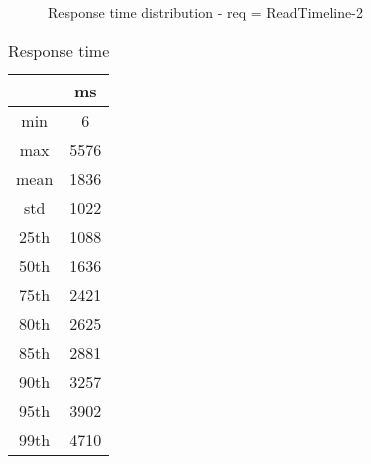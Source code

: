 \begin{minipage}{0.75\linewidth}
\begin{figure}[h]
\begin{adjustbox}{max width=1.0\linewidth, keepaspectratio}
  \end{adjustbox}
  \caption{Response time distribution - req = ReadTimeline-2}
\end{figure}
\end{minipage}\hfill\begin{minipage}{0.18\linewidth}
\begin{table}[h]
\begin{tabular}{|cc|}
\hline
\textbf{} & \textbf{ms}\\ \hline
 \Xhline{0.005\arrayrulewidth}
min & 6\\
 \Xhline{0.005\arrayrulewidth}
max & 5576\\
 \Xhline{0.005\arrayrulewidth}
mean & 1836\\
 \Xhline{0.005\arrayrulewidth}
std & 1022\\
\hline
\hline
 \Xhline{0.005\arrayrulewidth}
25th & 1088\\
 \Xhline{0.005\arrayrulewidth}
50th & 1636\\
 \Xhline{0.005\arrayrulewidth}
75th & 2421\\
 \Xhline{0.005\arrayrulewidth}
80th & 2625\\
 \Xhline{0.005\arrayrulewidth}
85th & 2881\\
 \Xhline{0.005\arrayrulewidth}
90th & 3257\\
 \Xhline{0.005\arrayrulewidth}
95th & 3902\\
 \Xhline{0.005\arrayrulewidth}
99th & 4710\\
\hline
\end{tabular}
\caption{Response time}
\end{table}
\end{minipage}\hfill